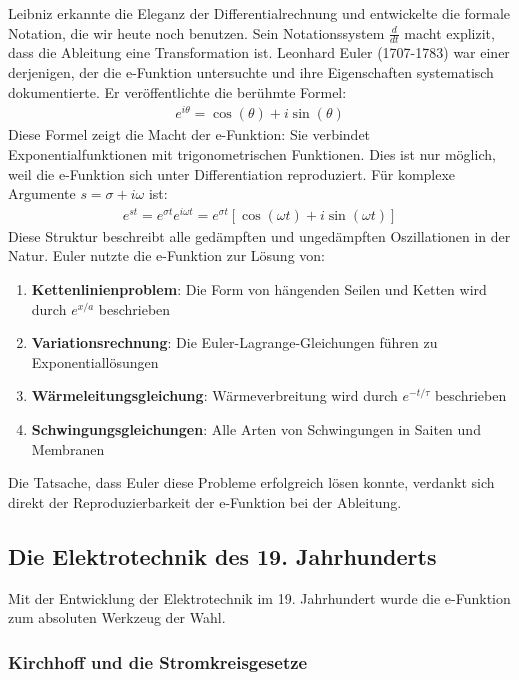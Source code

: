 \documentclass[a4paper,12pt,twoside]{report}
\theoremstyle{definition}
\begin{document}
Leibniz erkannte die Eleganz der Differentialrechnung und entwickelte die formale Notation, die wir heute noch benutzen. Sein Notationssystem $\frac{d}{dt}$ macht explizit, dass die Ableitung eine Transformation ist. Leonhard Euler (1707-1783) war einer derjenigen, der die e-Funktion untersuchte und ihre Eigenschaften systematisch dokumentierte. Er veröffentlichte die berühmte Formel:
\begin{align}
	e^{i\theta} = \cos(\theta) + i \sin(\theta)
\end{align}
Diese Formel zeigt die Macht der e-Funktion: Sie verbindet Exponentialfunktionen mit trigonometrischen Funktionen. Dies ist nur möglich, weil die e-Funktion sich unter Differentiation reproduziert. Für komplexe Argumente $s = \sigma + i\omega$ ist:
\begin{align}
	e^{st} = e^{\sigma t} e^{i\omega t} = e^{\sigma t}[\cos(\omega t) + i\sin(\omega t)]
\end{align}
Diese Struktur beschreibt alle gedämpften und ungedämpften Oszillationen in der Natur. Euler nutzte die e-Funktion zur Lösung von:
\begin{enumerate}
	\item \textbf{Kettenlinienproblem}: Die Form von hängenden Seilen und Ketten wird durch $e^{x/a}$ beschrieben
	\item \textbf{Variationsrechnung}: Die Euler-Lagrange-Gleichungen führen zu Exponentiallösungen
	\item \textbf{Wärmeleitungsgleichung}: Wärmeverbreitung wird durch $e^{-t/\tau}$ beschrieben
	\item \textbf{Schwingungsgleichungen}: Alle Arten von Schwingungen in Saiten und Membranen
\end{enumerate}

Die Tatsache, dass Euler diese Probleme erfolgreich lösen konnte, verdankt sich direkt der Reproduzierbarkeit der e-Funktion bei der Ableitung.

\subsection{Die Elektrotechnik des 19. Jahrhunderts}

Mit der Entwicklung der Elektrotechnik im 19. Jahrhundert wurde die e-Funktion zum absoluten Werkzeug der Wahl.

\subsubsection*{Kirchhoff und die Stromkreisgesetze}
\end{document}
